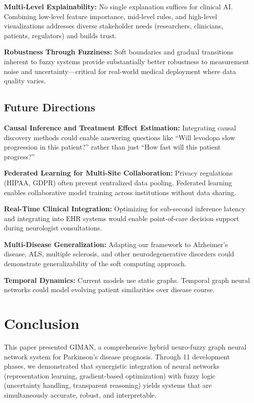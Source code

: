 \documentclass[conference]{IEEEtran}
\begin{document}
{{{\textbf{Multi-Level Explainability:} No single explanation suffices for clinical AI. Combining low-level feature importance, mid-level rules, and high-level visualizations addresses diverse stakeholder needs (researchers, clinicians, patients, regulators) and builds trust.

\textbf{Robustness Through Fuzziness:} Soft boundaries and gradual transitions inherent to fuzzy systems provide substantially better robustness to measurement noise and uncertainty---critical for real-world medical deployment where data quality varies.

\subsection{Future Directions}

\textbf{Causal Inference and Treatment Effect Estimation:} Integrating causal discovery methods could enable answering questions like ``Will levodopa slow progression in this patient?'' rather than just ``How fast will this patient progress?''

\textbf{Federated Learning for Multi-Site Collaboration:} Privacy regulations (HIPAA, GDPR) often prevent centralized data pooling. Federated learning enables collaborative model training across institutions without data sharing.

\textbf{Real-Time Clinical Integration:} Optimizing for sub-second inference latency and integrating into EHR systems would enable point-of-care decision support during neurologist consultations.

\textbf{Multi-Disease Generalization:} Adapting our framework to Alzheimer's disease, ALS, multiple sclerosis, and other neurodegenerative disorders could demonstrate generalizability of the soft computing approach.

\textbf{Temporal Dynamics:} Current models use static graphs. Temporal graph neural networks \cite{kazemi2020representation} could model evolving patient similarities over disease course.

\section{Conclusion}

This paper presented GIMAN, a comprehensive hybrid neuro-fuzzy graph neural network system for Parkinson's disease prognosis. Through 11 development phases, we demonstrated that synergistic integration of neural networks (representation learning, gradient-based optimization) with fuzzy logic (uncertainty handling, transparent reasoning) yields systems that are simultaneously accurate, robust, and interpretable.

}}}
\end{document}
